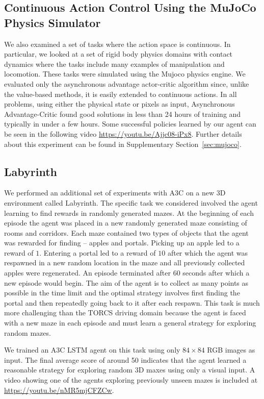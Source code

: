 \documentclass{article} %
\begin{document}
%

\subsection{Continuous Action Control Using the MuJoCo Physics Simulator}
We also examined a set of tasks where the action space is continuous.
In particular, we looked at a set of rigid body physics domains with contact dynamics
where the tasks include many examples of manipulation and locomotion.
These tasks were simulated using the Mujoco physics engine.
We evaluated only the asynchronous advantage actor-critic algorithm since, unlike the value-based methods, it is easily extended to continuous actions.
In all problems, using either the physical state or pixels as input, Asynchronous Advantage-Critic found good solutions in less than 24 hours of training and typically in under a few hours.
%
Some successful policies learned by our agent can be seen in the following video \url{https://youtu.be/Ajjc08-iPx8}.
Further details about this experiment can be found in Supplementary Section~\ref{sec:mujoco}.

\subsection{Labyrinth}

%
%
%
%
%
%

We performed an additional set of experiments with A3C on a new 3D environment called Labyrinth.
The specific task we considered involved the agent learning to find rewards in randomly generated mazes.
At the beginning of each episode the agent was placed in a new randomly generated maze consisting of rooms and corridors.
Each maze contained two types of objects that the agent was rewarded for finding -- apples and portals.
Picking up an apple led to a reward of $1$.  Entering a portal led to a reward of $10$ after which the agent was respawned in a new random location in the maze and all previously collected apples were regenerated.
An episode terminated after 60 seconds after which a new episode would begin.
The aim of the agent is to collect as many points as possible in the time limit and the optimal strategy involves first finding the portal and then repeatedly going back to it after each respawn.
This task is much more challenging than the TORCS driving domain because the agent is faced with a new maze in each episode and must learn a general strategy for exploring random mazes.

We trained an A3C LSTM agent on this task using only $84\times 84$ RGB images as input.
%
The final average score of around 50 indicates that the agent learned a reasonable strategy for exploring random 3D maxes using only a visual input.
%
A video showing one of the agents exploring previously unseen mazes is included at \url{https://youtu.be/nMR5mjCFZCw}.
\end{document}
